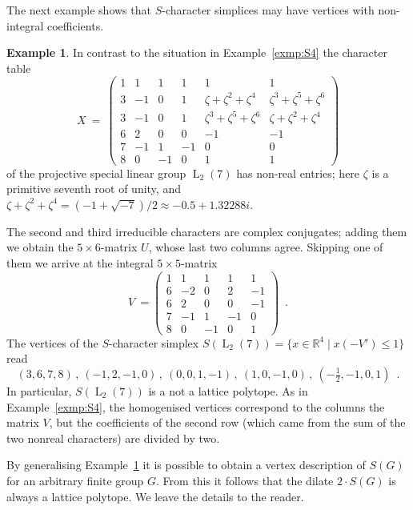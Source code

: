 \documentclass[12pt,leqno,a4paper]{amsart}
\newcommand{\RR}{{\mathbb{R}}}
\newcommand{\PSL}{{\operatorname{L}}}
\theoremstyle{definition}
\newtheorem{exmp}[thm]{Example}
\begin{document}
The next example shows that $S$-character simplices may have vertices with
non-integral coefficients.
\begin{exmp} \label{exmp:L27}
  In contrast to the situation in Example~\ref{exmp:S4} the character table
  \[
    X \ = \ 
    \begin{pmatrix}
      1 & 1 & 1 & 1 & 1 & 1 \\
      3 & -1 & 0 & 1 & \zeta+\zeta^2+\zeta^4 & \zeta^3+\zeta^5+\zeta^6 \\
      3 & -1 & 0 & 1 & \zeta^3+\zeta^5+\zeta^6 & \zeta+\zeta^2+\zeta^4 \\
      6 & 2 & 0 & 0 & -1 & -1 \\
      7 & -1 & 1 & -1 & 0 & 0 \\
      8 & 0 & -1 & 0 & 1 & 1
    \end{pmatrix}
  \]
  of the projective special linear group $\PSL_2(7)$ has non-real entries; here
  $\zeta$ is a primitive seventh root of unity, and
  $\zeta+\zeta^2+\zeta^4=(-1+\sqrt{-7})/2 \approx -0.5 + 1.32288i$.

  The second and third irreducible characters are complex conjugates; adding
  them we obtain the $5{\times}6$-matrix $U$, whose last two columns agree.
  Skipping one of them we arrive at the integral $5{\times}5$-matrix
  \[
    V \ = 
    \begin{pmatrix}
      1 & 1 & 1 & 1 & 1 \\
      6 & -2 & 0 & 2 & -1 \\
      6 & 2 & 0 & 0 & -1 \\
      7 & -1 & 1 & -1 & 0 \\
      8 & 0 & -1 & 0 & 1
    \end{pmatrix} \enspace .
  \]
  The vertices of the $S$-character simplex $S(\PSL_2(7))=\{ x\in\RR^4 \mid x (-V') \leq 1 \}$ read
  \[
    (3,6,7,8) \,,\ (-1,2,-1,0) \,,\ (0,0,1,-1) \,,\ (1,0,-1,0) \,,\ (-\tfrac{1}{2},-1,0,1)\enspace .
  \]
  In particular, $S(\PSL_2(7))$ is a not a lattice polytope.
  As in Example~\ref{exmp:S4}, the homogenised vertices correspond to the
  columns the matrix $V$, but the coefficients of the second row (which came
  from the sum of the two nonreal characters) are divided by two.
\end{exmp}

By generalising Example~\ref{exmp:L27} it is possible to obtain a vertex
description of $S(G)$ for an arbitrary finite group $G$.
From this it follows that the dilate $2\cdot S(G)$ is always a lattice polytope.
We leave the details to the reader.
\end{document}
